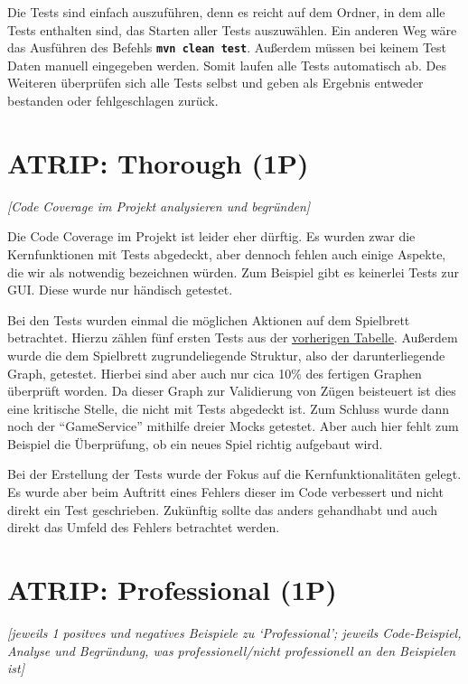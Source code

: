 \noindent Die Tests sind einfach auszuführen, denn es reicht auf dem Ordner, in dem alle Tests enthalten sind, das Starten aller Tests auszuwählen. Ein anderen Weg wäre das Ausführen des Befehls \textbf{\texttt{mvn clean test}}. Außerdem müssen bei keinem Test Daten manuell eingegeben werden. Somit laufen alle Tests automatisch ab. Des Weiteren überprüfen sich alle Tests selbst und geben als Ergebnis entweder bestanden oder fehlgeschlagen zurück.

\newpage
\section{ATRIP: Thorough (1P)}
\emph{[Code Coverage im Projekt analysieren und begründen]}
\vspace{.4cm}

\noindent Die Code Coverage im Projekt ist leider eher dürftig. Es wurden zwar die Kernfunktionen mit Tests abgedeckt, aber dennoch fehlen auch einige Aspekte, die wir als notwendig bezeichnen würden. Zum Beispiel gibt es keinerlei Tests zur GUI. Diese wurde nur händisch getestet.

Bei den Tests wurden einmal die möglichen Aktionen auf dem Spielbrett betrachtet. Hierzu zählen fünf ersten Tests aus der \hyperref[tab:unittesttable]{vorherigen Tabelle}. Außerdem wurde die dem Spielbrett zugrundeliegende Struktur, also der darunterliegende Graph, getestet. Hierbei sind aber auch nur cica 10\% des fertigen Graphen überprüft worden. Da dieser Graph zur Validierung von Zügen beisteuert ist dies eine kritische Stelle, die nicht mit Tests abgedeckt ist. Zum Schluss wurde dann noch der \enquote{GameService} mithilfe dreier Mocks getestet. Aber auch hier fehlt zum Beispiel die Überprüfung, ob ein neues Spiel richtig aufgebaut wird.

Bei der Erstellung der Tests wurde der Fokus auf die Kernfunktionalitäten gelegt. Es wurde aber beim Auftritt eines Fehlers dieser im Code verbessert und nicht direkt ein Test geschrieben. Zukünftig sollte das anders gehandhabt und auch direkt das Umfeld des Fehlers betrachtet werden.

\newpage
\section{ATRIP: Professional (1P)}
\emph{[jeweils 1 positves und negatives Beispiele zu ‘Professional’; jeweils Code-Beispiel, Analyse und
Begründung, was professionell/nicht professionell an den Beispielen ist]}

